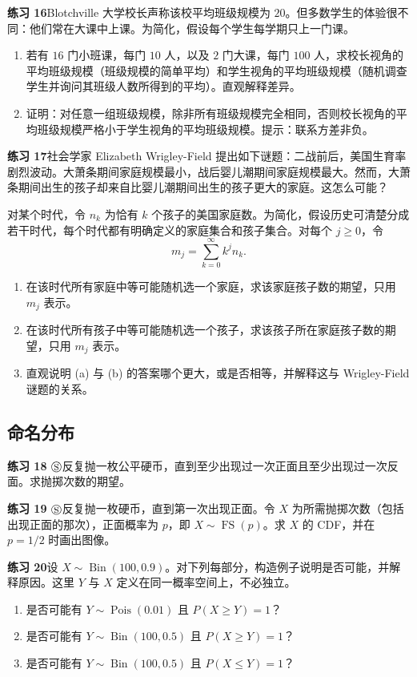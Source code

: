 \documentclass[UTF8,12pt,a4paper,fontset=fandol]{ctexart}
\begin{document}
\noindent\textbf{练习 16}\quad Blotchville 大学校长声称该校平均班级规模为 $20$。但多数学生的体验很不同：他们常在大课中上课。为简化，假设每个学生每学期只上一门课。
\begin{enumerate}
  \item[(a)] 若有 $16$ 门小班课，每门 $10$ 人，以及 $2$ 门大课，每门 $100$ 人，求校长视角的平均班级规模（班级规模的简单平均）和学生视角的平均班级规模（随机调查学生并询问其班级人数所得到的平均）。直观解释差异。
  \item[(b)] 证明：对任意一组班级规模，除非所有班级规模完全相同，否则校长视角的平均班级规模严格小于学生视角的平均班级规模。提示：联系方差非负。
\end{enumerate}

\noindent\textbf{练习 17}\quad 社会学家 Elizabeth Wrigley-Field 提出如下谜题：二战前后，美国生育率剧烈波动。大萧条期间家庭规模最小，战后婴儿潮期间家庭规模最大。然而，大萧条期间出生的孩子却来自比婴儿潮期间出生的孩子更大的家庭。这怎么可能？

对某个时代，令 $n_k$ 为恰有 $k$ 个孩子的美国家庭数。为简化，假设历史可清楚分成若干时代，每个时代都有明确定义的家庭集合和孩子集合。对每个 $j\ge 0$，令
\[
  m_j=\sum_{k=0}^{\infty} k^j n_k.
\]
\begin{enumerate}
  \item[(a)] 在该时代所有家庭中等可能随机选一个家庭，求该家庭孩子数的期望，只用 $m_j$ 表示。
  \item[(b)] 在该时代所有孩子中等可能随机选一个孩子，求该孩子所在家庭孩子数的期望，只用 $m_j$ 表示。
  \item[(c)] 直观说明 (a) 与 (b) 的答案哪个更大，或是否相等，并解释这与 Wrigley-Field 谜题的关系。
\end{enumerate}

\subsection*{命名分布}

\noindent\textbf{练习 18 $\circledS$}\quad 反复抛一枚公平硬币，直到至少出现过一次正面且至少出现过一次反面。求抛掷次数的期望。

\noindent\textbf{练习 19 $\circledS$}\quad 反复抛一枚硬币，直到第一次出现正面。令 $X$ 为所需抛掷次数（包括出现正面的那次），正面概率为 $p$，即 $X\sim\operatorname{FS}(p)$。求 $X$ 的 CDF，并在 $p=1/2$ 时画出图像。

\noindent\textbf{练习 20}\quad 设 $X\sim\operatorname{Bin}(100,0.9)$。对下列每部分，构造例子说明是否可能，并解释原因。这里 $Y$ 与 $X$ 定义在同一概率空间上，不必独立。
\begin{enumerate}
  \item[(a)] 是否可能有 $Y\sim\operatorname{Pois}(0.01)$ 且 $P(X\ge Y)=1$？
  \item[(b)] 是否可能有 $Y\sim\operatorname{Bin}(100,0.5)$ 且 $P(X\ge Y)=1$？
  \item[(c)] 是否可能有 $Y\sim\operatorname{Bin}(100,0.5)$ 且 $P(X\le Y)=1$？
\end{enumerate}
\end{document}
